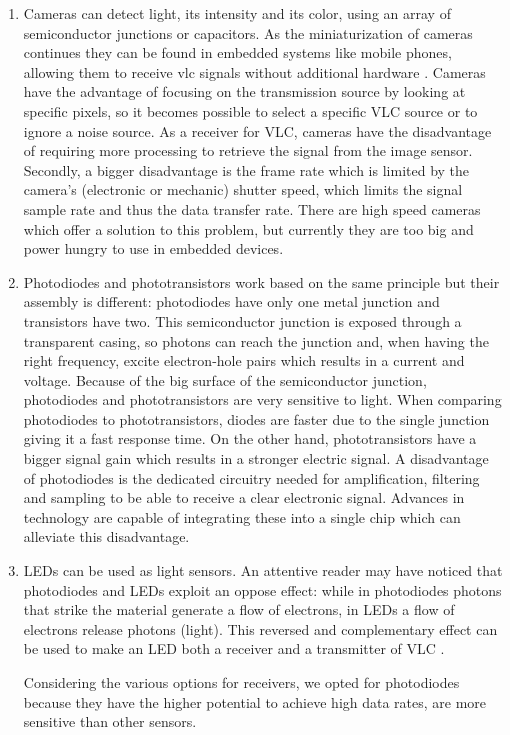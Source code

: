 \begin{enumerate}

\item Cameras can detect light, its intensity and its color, using an array of semiconductor
junctions or capacitors. As the miniaturization of cameras continues
they can be found in embedded systems like mobile phones, allowing
them to receive vlc signals without additional hardware \cite{camera}. Cameras have
the advantage of focusing on the transmission source by looking at specific
pixels, so it becomes possible to select a specific VLC source or to ignore
a noise source. As a receiver for VLC, cameras have the disadvantage
of requiring more processing to retrieve the signal from the image sensor.
Secondly, a bigger disadvantage is the frame rate which is limited by the
camera’s (electronic or mechanic) shutter speed, which limits the signal
sample rate and thus the data transfer rate. There are high speed
cameras which offer a solution to this problem, but currently they are
too big and power hungry to use in embedded devices.

\item Photodiodes and phototransistors work based on the same principle but
their assembly is different: photodiodes have only one metal junction and
transistors have two. This semiconductor junction is exposed through a
transparent casing, so photons can reach the junction and, when having
the right frequency, excite electron-hole pairs which results in a current and
voltage. Because of the big surface of the semiconductor junction, photodiodes
and phototransistors are very sensitive to light. When comparing
photodiodes to phototransistors, diodes are faster due to the single junction
giving it a fast response time. On the other hand, phototransistors have a
bigger signal gain which results in a stronger electric signal. A disadvantage
of photodiodes is the dedicated circuitry needed for amplification, filtering
and sampling to be able to receive a clear electronic signal. Advances in
technology are capable of integrating these into a single chip which can
alleviate this disadvantage.

\item LEDs can be used as light sensors. An attentive reader may have noticed that photodiodes and LEDs exploit an oppose effect: while in photodiodes photons that strike the material generate a flow of electrons, in LEDs a flow of electrons release photons (light). This reversed and complementary effect can be used to make an LED both a receiver and a transmitter of VLC \citep{led2led}.

Considering the various options for receivers, we opted for photodiodes because
they have the higher potential to achieve high data rates, are more sensitive
than other sensors.

\end{enumerate}

